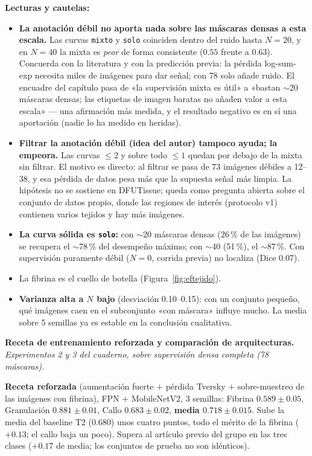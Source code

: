 \documentclass[12pt,letterpaper]{report}
\newcommand{\entrada}[2]{%
    \vspace{0.6em}
    \noindent\textbf{#1.} \textit{#2}
    \vspace{0.3em}
    \par
}
\begin{document}
\textbf{Lecturas y cautelas:}
\begin{itemize}[leftmargin=1.5em]
    \item \textbf{La anotación débil no aporta nada sobre las máscaras densas a esta escala.} Las
        curvas \texttt{mixto} y \texttt{solo} coinciden dentro del ruido hasta $N=20$, y en $N=40$ la
        mixta es \emph{peor} de forma consistente ($0.55$ frente a $0.63$). Concuerda con la
        literatura y con la predicción previa:
        la pérdida log-sum-exp necesita miles de imágenes para dar señal; con 78 solo añade ruido.
        El encuadre del capítulo pasa de «la supervisión mixta es útil» a «bastan $\sim$20 máscaras
        densas; las etiquetas de imagen baratas no añaden valor a esta escala» --- una afirmación más
        medida, y el resultado negativo es en sí una aportación (nadie lo ha medido en heridas).
    \item \textbf{Filtrar la anotación débil (idea del autor) tampoco ayuda; la empeora.} Las curvas
        \texttt{$\leq 2$} y sobre todo \texttt{$\leq 1$} quedan por debajo de la mixta sin filtrar. El
        motivo es directo: al filtrar se pasa de 73 imágenes débiles a 12--38, y esa pérdida de datos
        pesa más que la supuesta señal más limpia. La hipótesis no se sostiene en DFUTissue; queda
        como pregunta abierta sobre el conjunto de datos propio, donde las regiones de interés
        (protocolo v1) contienen varios tejidos y hay más imágenes.
    \item \textbf{La curva sólida es \texttt{solo}:} con $\sim$20 máscaras densas (26\,\% de las
        imágenes) se recupera el $\sim$78\,\% del desempeño máximo; con $\sim$40 (51\,\%), el
        $\sim$87\,\%. Con supervisión puramente débil ($N=0$, corrida previa) no localiza (Dice 0.07).
    \item La fibrina es el cuello de botella (Figura~\ref{fig:eftejido}).
    \item \textbf{Varianza alta a $N$ bajo} (desviación 0.10--0.15): con un conjunto pequeño, qué
        imágenes caen en el subconjunto «con máscara» influye mucho. La media sobre 5 semillas ya es
        estable en la conclusión cualitativa.
\end{itemize}

\entrada{Receta de entrenamiento reforzada y comparación de arquitecturas}{Experimentos 2 y 3 del
cuaderno, sobre supervisión densa completa (78 máscaras).}

\textbf{Receta reforzada} (aumentación fuerte $+$ pérdida Tversky $+$ sobre-muestreo de las imágenes
con fibrina), FPN $+$ MobileNetV2, 3 semillas: Fibrina $0.589 \pm 0.05$, Granulación
$0.881 \pm 0.01$, Callo $0.683 \pm 0.02$, \textbf{media $0.718 \pm 0.015$}. Sube la media del
baseline T2 ($0.680$) unos cuatro puntos, todo el mérito de la fibrina ($+0.13$; el callo baja un
poco). Supera al artículo previo del grupo en las tres clases ($+0.17$ de media; los conjuntos de
prueba no son idénticos).
\end{document}
